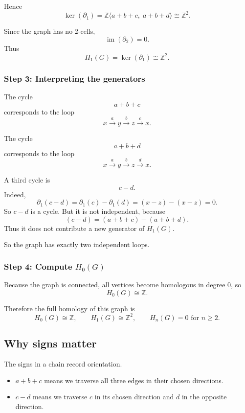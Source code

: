 \documentclass[12pt,a4paper]{article}
\theoremstyle{notespace}
\begin{document}
	Hence
	\[
	\ker(\partial_1)=\mathbb{Z}\langle a+b+c,\;a+b+d\rangle \cong \mathbb{Z}^2.
	\]
	
	Since the graph has no \(2\)-cells,
	\[
	\operatorname{im}(\partial_2)=0.
	\]
	Thus
	\[
	H_1(G)=\ker(\partial_1)\cong \mathbb{Z}^2.
	\]
	
	\subsubsection*{Step 3: Interpreting the generators}
	
	The cycle
	\[
	a+b+c
	\]
	corresponds to the loop
	\[
	x \xrightarrow{a} y \xrightarrow{b} z \xrightarrow{c} x.
	\]
	
	The cycle
	\[
	a+b+d
	\]
	corresponds to the loop
	\[
	x \xrightarrow{a} y \xrightarrow{b} z \xrightarrow{d} x.
	\]
	
	A third cycle is
	\[
	c-d.
	\]
	Indeed,
	\[
	\partial_1(c-d)=\partial_1(c)-\partial_1(d)=(x-z)-(x-z)=0.
	\]
	So \(c-d\) is a cycle. But it is not independent, because
	\[
	(c-d)=(a+b+c)-(a+b+d).
	\]
	Thus it does not contribute a new generator of \(H_1(G)\).
	
	So the graph has exactly two independent loops.
	
	\subsubsection*{Step 4: Compute \(H_0(G)\)}
	
	Because the graph is connected, all vertices become homologous in degree \(0\), so
	\[
	H_0(G)\cong \mathbb{Z}.
	\]
	
	Therefore the full homology of this graph is
	\[
	H_0(G)\cong \mathbb{Z},\qquad
	H_1(G)\cong \mathbb{Z}^2,\qquad
	H_n(G)=0 \text{ for } n\ge 2.
	\]
	
	\subsection{Why signs matter}
	
	The signs in a chain record orientation.
	
	\begin{itemize}[leftmargin=2em]
		\item \(a+b+c\) means we traverse all three edges in their chosen directions.
		\item \(c-d\) means we traverse \(c\) in its chosen direction and \(d\) in the opposite direction.
	\end{itemize}
	
\end{document}
